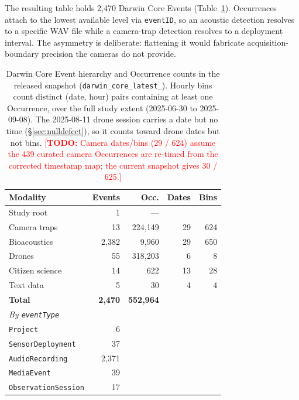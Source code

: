 \documentclass[sigconf]{acmart}
\newcommand{\TODO}[1]{\textcolor{red}{\footnotesize[\textbf{TODO:} #1]}}
\newcommand{\TODO}[1]{}
\begin{document}
The resulting table holds 2{,}470 Darwin Core Events
(Table~\ref{tab:schema}). Occurrences attach to the lowest available
level via \texttt{eventID}, so an acoustic detection resolves to a
specific WAV file while a camera-trap detection resolves to a deployment
interval. The asymmetry is deliberate: flattening it would fabricate
acquisition-boundary precision the cameras do not provide.

\begin{table}[t]
\caption{Darwin Core Event hierarchy and Occurrence counts in the
released snapshot (\texttt{darwin\_core\_\allowbreak latest\_}). Hourly bins count
distinct (date, hour) pairs containing at least one Occurrence, over
the full study extent (2025-06-30 to 2025-09-08). The 2025-08-11 drone
session carries a date but no time (\S\ref{sec:nulldefect}), so it
counts toward drone dates but not bins.
\TODO{Camera dates/bins (29 / 624) assume the 439 curated camera
Occurrences are re-timed from the corrected timestamp map; the current
snapshot gives 30 / 625.}}
\label{tab:schema}
\small
\begin{tabular}{lrrrr}
\toprule
\textbf{Modality} & \textbf{Events} & \textbf{Occ.} & \textbf{Dates} & \textbf{Bins} \\
\midrule
Study root & 1 & --- & & \\
Camera traps & 13 & 224{,}149 & 29 & 624 \\
Bioacoustics & 2{,}382 & 9{,}960 & 29 & 650 \\
Drones & 55 & 318{,}203 & 6 & 8 \\
Citizen science & 14 & 622 & 13 & 28 \\
Text data & 5 & 30 & 4 & 4 \\
\midrule
\textbf{Total} & \textbf{2{,}470} & \textbf{552{,}964} & & \\
\midrule
\multicolumn{5}{l}{\emph{By \texttt{eventType}}} \\
\texttt{Project} & 6 & & & \\
\texttt{SensorDeployment} & 37 & & & \\
\texttt{AudioRecording} & 2{,}371 & & & \\
\texttt{MediaEvent} & 39 & & & \\
\texttt{ObservationSession} & 17 & & & \\
\bottomrule
\end{tabular}
\end{table}
\end{document}
